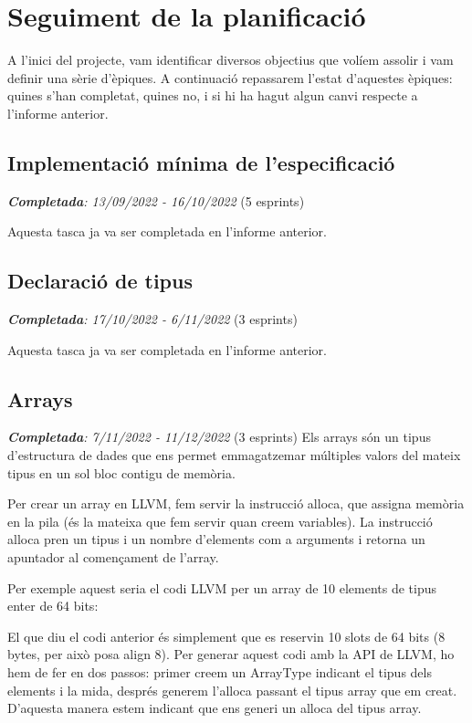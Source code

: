﻿\documentclass{article}
\begin{document}
\section{Seguiment de la planificació}

A l'inici del projecte, vam identificar diversos objectius que volíem assolir
i vam definir una sèrie d'èpiques.  A continuació repassarem l'estat d'aquestes
èpiques: quines s'han completat, quines no, i si hi ha hagut algun canvi
respecte a l'informe anterior.

\subsection{Implementació mínima de l'especificació}
\textit{\textbf{Completada}: 13/09/2022 - 16/10/2022} (5 esprints)

Aquesta tasca ja va ser completada en l'informe anterior.

\subsection{Declaració de tipus}
\textit{\textbf{Completada}: 17/10/2022 - 6/11/2022} (3 esprints)

Aquesta tasca ja va ser completada en l'informe anterior.

\subsection{Arrays}
\textit{\textbf{Completada}: 7/11/2022 - 11/12/2022} (3 esprints)
Els arrays són un tipus d'estructura de dades que ens permet emmagatzemar 
múltiples valors del mateix tipus en un sol bloc contigu de memòria. 

Per crear un array en LLVM, fem servir la instrucció alloca, que assigna memòria
en la pila (és la mateixa que fem servir quan creem variables). La instrucció
alloca pren un tipus i un nombre d'elements com a arguments i retorna un
apuntador al començament de l'array.

Per exemple aquest seria el codi LLVM per un array de 10 elements de tipus 
enter de 64 bits:

\begin{code}
\end{code}

El que diu el codi anterior és simplement que es reservin 10 slots de 64 bits 
(8 bytes, per això posa align 8). Per generar aquest codi amb la API de LLVM,
ho hem de fer en dos passos: primer creem un ArrayType indicant el tipus dels
elements i la mida, després generem l'alloca passant el tipus array que em creat.
D'aquesta manera estem indicant que ens generi un alloca del tipus array.
\end{document}
